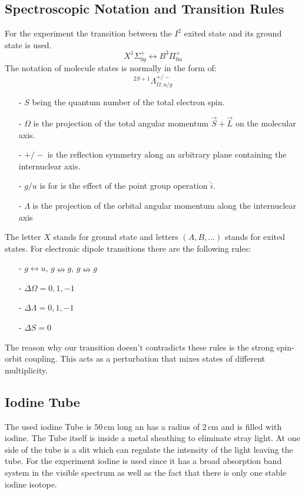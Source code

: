 \subsection{Spectroscopic Notation and Transition Rules}
For the experiment the transition between the $I^2$ exited state and its ground state is used.
\begin{equation}
	X^1\Sigma^+_{0g}\leftrightarrow B^3\Pi^+_{0u}
\end{equation}
The notation of molecule states is normally in the form of:
\begin{equation}
	^{2S+1}\Lambda^{+/-}_{\Omega,u/g}
\end{equation}
\begin{enumerate}
	\item[-] $S$ being the quantum number of the total electron spin.
	\item[-] $\Omega$ is the projection of the total angular momentum $\vec{S}+\vec{L}$ on the molecular axis.
	\item[-] $+/-$ is the reflection symmetry along an arbitrary plane containing the internuclear axis.
	\item[-]$g/u$ is for  is the effect of the point group operation $\hat{i}$.
	\item[-]$\Lambda$ is the projection of the orbital angular momentum along the internuclear axis
\end{enumerate}
The letter $X$ stands for ground state and letters $(A,B,...)$ stands for exited states. For electronic dipole transitions there are the following rules:
\begin{enumerate}
	\item[-] $g\leftrightarrow u$, $g\nleftrightarrow g$, $g\nleftrightarrow g$
	\item[-] $\Delta \Omega=0,1,-1$
	\item[-] $\Delta \Lambda=0,1,-1$
	\item[-] $\Delta S=0$
\end{enumerate}
The reason why our transition doesn't contradicts these rules is the strong spin-orbit coupling. This acts as a perturbation that mixes states of different multiplicity.
\subsection{Iodine Tube}
The used iodine Tube is $50$\,cm long an has a radius of $2\,$cm and is filled with iodine. The Tube itself is inside a metal sheathing to eliminate stray light. At one side of the tube is a slit which can regulate the intensity of the light leaving the tube. For the experiment iodine is used since it has a broad absorption band system in the visible spectrum as well as the fact that there is only one stable iodine isotope.
\newpage
